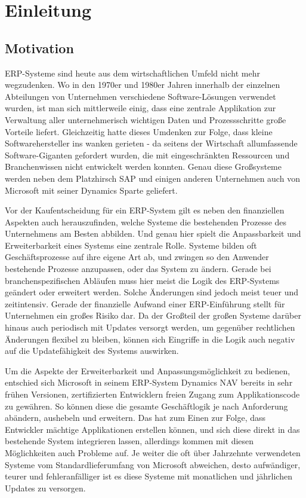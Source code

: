 \chapter{Einleitung}
\label{cha:Motivation}

\section{Motivation}
\label{sec:Motivation}
ERP-Systeme sind heute aus dem wirtschaftlichen Umfeld nicht mehr wegzudenken. \cite{WongTein2003} \cite{DuplagaMarzie2003} Wo in den 1970er und 1980er Jahren innerhalb der einzelnen Abteilungen von Unternehmen verschiedene Software-Lösungen verwendet wurden, ist man sich mittlerweile einig, dass eine zentrale Applikation zur Verwaltung aller unternehmerisch wichtigen Daten und Prozessschritte große Vorteile liefert.
Gleichzeitig hatte dieses Umdenken zur Folge, dass kleine Softwarehersteller ins wanken gerieten - da seitens der Wirtschaft allumfassende Software-Giganten gefordert wurden, die mit eingeschränkten Ressourcen und Branchenwissen nicht entwickelt werden konnten. Genau diese Großsysteme werden neben dem Platzhirsch SAP und einigen anderen Unternehmen auch von Microsoft mit seiner Dynamics Sparte geliefert.

Vor der Kaufentscheidung für ein ERP-System gilt es neben den finanziellen Aspekten auch herauszufinden, welche Systeme die bestehenden Prozesse des Unternehmens am Besten abbilden. \cite{WongTein2003} Und genau hier spielt die Anpassbarkeit und Erweiterbarkeit eines Systems eine zentrale Rolle. Systeme bilden oft Geschäftsprozesse auf ihre eigene Art ab, und zwingen so den Anwender bestehende Prozesse anzupassen, oder das System zu ändern. Gerade bei branchenspezifischen Abläufen muss hier meist die Logik des ERP-Systems geändert oder erweitert werden. Solche Änderungen sind jedoch meist teuer und zeitintensiv. Gerade der finanzielle Aufwand einer ERP-Einführung stellt für Unternehmen ein großes Risiko dar. Da der Großteil der großen Systeme darüber hinaus auch periodisch mit Updates versorgt werden, um gegenüber rechtlichen Änderungen flexibel zu bleiben, können sich Eingriffe in die Logik auch negativ auf die Updatefähigkeit des Systems auswirken. 

Um die Aspekte der Erweiterbarkeit und Anpassungsmöglichkeit zu bedienen, entschied sich Microsoft in seinem ERP-System Dynamics NAV bereits in sehr frühen Versionen, zertifizierten Entwicklern freien Zugang zum Applikationscode zu gewähren. \cite{BrummelPatterns2015} So können diese die gesamte Geschäftlogik je nach Anforderung abändern, aushebeln und erweitern. Das hat zum Einen zur Folge, dass Entwickler mächtige Applikationen erstellen können, und sich diese direkt in das bestehende System integrieren lassen, allerdings kommen mit diesen Möglichkeiten auch Probleme auf. Je weiter die oft über Jahrzehnte verwendeten Systeme vom Standardlieferumfang von Microsoft abweichen, desto aufwändiger, teurer und fehleranfälliger ist es diese Systeme mit monatlichen und jährlichen Updates zu versorgen. 

